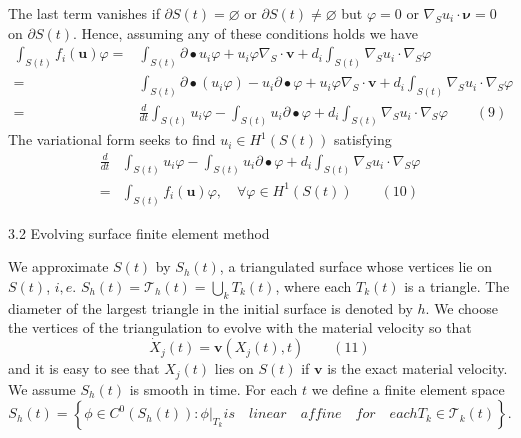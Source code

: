 \documentclass[notheorems,serif]{beamer}
\begin{document}
\begin{frame}
The last term vanishes if $\partial S(t)=\varnothing$ or $\partial S(t)\ne\varnothing$ but $\varphi=0$ or $\nabla_Su_i\cdot\boldsymbol{\nu}=0$ on $\partial S(t)$. Hence, assuming any of these conditions holds we have
\begin{equation*}
\begin{aligned}
\int_{S(t)}f_i(\boldsymbol{u})\varphi=&\int_{S(t)}\partial\bullet u_i\varphi+u_i\varphi\nabla_S\cdot\boldsymbol{v}+d_i\int_{S(t)}\nabla_Su_i\cdot\nabla_S\varphi\\
=&\int_{S(t)}\partial\bullet (u_i\varphi)-u_i\partial\bullet\varphi+u_i\varphi\nabla_S\cdot\boldsymbol{v}+d_i\int_{S(t)}\nabla_Su_i\cdot\nabla_S\varphi\\
=&\frac{d}{dt}\int_{S(t)}u_i\varphi-\int_{S(t)}u_i\partial\bullet\varphi+d_i\int_{S(t)}\nabla_Su_i\cdot\nabla_S\varphi\qquad(9)
\end{aligned}
\end{equation*}
The variational form seeks to find $u_i\in H^1(S(t))$ satisfying
\begin{equation*}
\begin{aligned}
\frac{d}{dt}&\int_{S(t)}u_i\varphi-\int_{S(t)}u_i\partial\bullet\varphi+d_i\int_{S(t)}\nabla_Su_i\cdot\nabla_S\varphi\\
=&\int_{S(t)}f_i(\boldsymbol{u})\varphi,\quad\forall\varphi\in H^1(S(t))\qquad(10)
\end{aligned}
\end{equation*}
\end{frame}

\begin{frame}
3.2 Evolving surface finite element method

We approximate $S(t)$ by $S_h(t)$, a triangulated surface whose vertices lie on $S(t)$, $i,e.$ $S_h(t)=\mathcal{T}_h(t)=\bigcup_kT_k(t)$, where each $T_k(t)$ is a triangle. The diameter of the largest triangle in the initial surface is denoted by $h$. We choose the vertices of the triangulation to evolve with the material velocity so that
\begin{equation*}
\dot{X}_j(t)=\boldsymbol{v}(X_j(t), t)\qquad(11)
\end{equation*}
and it is easy to see that $X_j(t)$ lies on $S(t)$ if $\boldsymbol{v}$ is the exact material velocity. We assume $S_h(t)$ is smooth in time. For each $t$ we define a finite  element space
\begin{equation*}
S_h(t)=\left\{\phi\in C^0(S_h(t)):\phi\bigg|_{T_k} is\quad linear\quad affine\quad for\quad each T_k\in\mathcal{T}_k(t) \right\}.
\end{equation*}
\end{frame}
\end{document}

